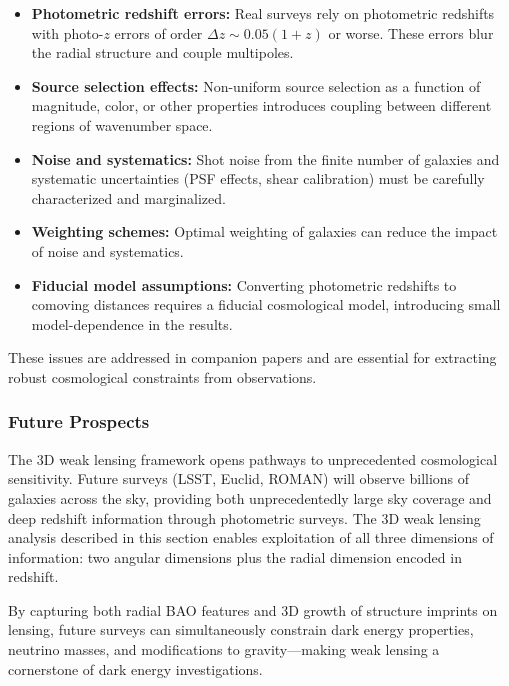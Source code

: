 \begin{itemize}
\item \textbf{Photometric redshift errors:} Real surveys rely on photometric redshifts with photo-$z$ errors of order $\Delta z \sim 0.05(1 + z)$ or worse. These errors blur the radial structure and couple multipoles.
\item \textbf{Source selection effects:} Non-uniform source selection as a function of magnitude, color, or other properties introduces coupling between different regions of wavenumber space.
\item \textbf{Noise and systematics:} Shot noise from the finite number of galaxies and systematic uncertainties (PSF effects, shear calibration) must be carefully characterized and marginalized.
\item \textbf{Weighting schemes:} Optimal weighting of galaxies can reduce the impact of noise and systematics.
\item \textbf{Fiducial model assumptions:} Converting photometric redshifts to comoving distances requires a fiducial cosmological model, introducing small model-dependence in the results.
\end{itemize}

These issues are addressed in companion papers and are essential for extracting robust cosmological constraints from observations.

\subsubsection{Future Prospects}

The 3D weak lensing framework opens pathways to unprecedented cosmological sensitivity. Future surveys (LSST, Euclid, ROMAN) will observe billions of galaxies across the sky, providing both unprecedentedly large sky coverage and deep redshift information through photometric surveys. The 3D weak lensing analysis described in this section enables exploitation of all three dimensions of information: two angular dimensions plus the radial dimension encoded in redshift.

By capturing both radial BAO features and 3D growth of structure imprints on lensing, future surveys can simultaneously constrain dark energy properties, neutrino masses, and modifications to gravity—making weak lensing a cornerstone of dark energy investigations.

